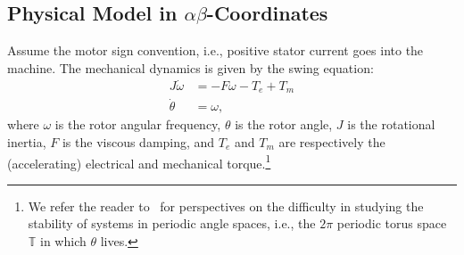 \subsection{Physical Model in $\alpha\beta$-Coordinates}
Assume the motor sign convention, i.e., positive stator current goes into the machine.
The mechanical dynamics is given by the swing equation:
\begin{align}
    J \dot{\omega} &= -F \omega - T_e + T_m \label{E:swing1} \\
    \dot\theta &= \omega, \label{E:swing2}
\end{align}
where $\omega$ is the rotor angular frequency, $\theta$ is the rotor angle, $J$ is the rotational inertia, $F$ is the viscous damping, and $T_e$ and $T_m$ are respectively the (accelerating) electrical and mechanical torque.\footnote{We refer the reader to~\cite{forni2014differential,efimov2017relaxed,efimov2019boundedness} for perspectives on the difficulty in studying the stability of systems in periodic angle spaces, i.e., the $2\pi$ periodic torus space $\mathbb{T}$ in which $\theta$ lives.}

